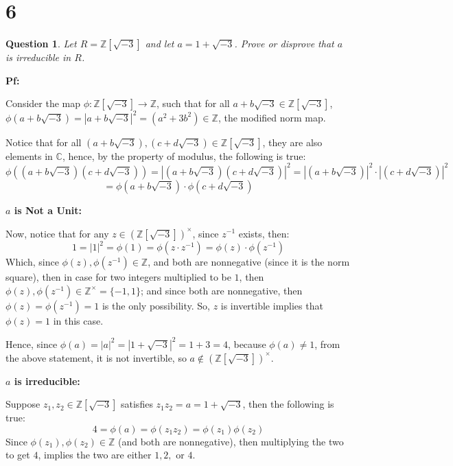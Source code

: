 \documentclass{article}
\newtheorem{question}{Question}
\begin{document}
\break

\section*{6}
\begin{myBox}[]{}
    \begin{question}
        Let $R=\mathbb{Z}[\sqrt{-3}]$ and let $a = 1 + \sqrt{-3}$. Prove or disprove that $a$ is irreducible in $R$.
    \end{question}
\end{myBox}

\textbf{Pf:}

Consider the map $\phi:\mathbb{Z}[\sqrt{-3}]\rightarrow \mathbb{Z}$, such that for all $a+b\sqrt{-3}\in \mathbb{Z}[\sqrt{-3}]$,
$\phi(a+b\sqrt{-3})=|a+b\sqrt{-3}|^2=(a^2+3b^2) \in \mathbb{Z}$, the modified norm map.

Notice that for all $(a+b\sqrt{-3}), (c+d\sqrt{-3})\in\mathbb{Z}[\sqrt{-3}]$, they are also elements in $\mathbb{C}$,
hence, by the property of modulus, the following is true:
$$\phi((a+b\sqrt{-3})(c+d\sqrt{-3})) = |(a+b\sqrt{-3})(c+d\sqrt{-3})|^2 = |(a+b\sqrt{-3})|^2\cdot|(c+d\sqrt{-3})|^2$$
$$=\phi(a+b\sqrt{-3})\cdot\phi(c+d\sqrt{-3})$$

\hfill

\textbf{$a$ is Not a Unit:}

Now, notice that for any $z\in(\mathbb{Z}[\sqrt{-3}])^\times$, since $z^{-1}$ exists, then:
$$1 = |1|^2 = \phi(1)=\phi(z\cdot z^{-1}) = \phi(z)\cdot\phi(z^{-1})$$
Which, since $\phi(z),\phi(z^{-1})\in\mathbb{Z}$, and both are nonnegative (since it is the norm square),
then in case for two integers multiplied to be $1$, then $\phi(z),\phi(z^{-1})\in \mathbb{Z}^\times = \{-1,1\}$;
and since both are nonnegative, then $\phi(z)=\phi(z^{-1})=1$ is the only possibility.
So, $z$ is invertible implies that $\phi(z)=1$ in this case.

Hence, since $\phi(a)=|a|^2=|1+\sqrt{-3}|^2 = 1+3 = 4$, because $\phi(a)\neq 1$, from the above statement, it is not invertible, so $a\notin (\mathbb{Z}[\sqrt{-3}])^\times$.

\hfill

\textbf{$a$ is irreducible:}

Suppose $z_1,z_2\in\mathbb{Z}[\sqrt{-3}]$ satisfies $z_1z_2= a = 1+\sqrt{-3}$, then the following is true:
$$4=\phi(a)=\phi(z_1z_2)=\phi(z_1)\phi(z_2)$$
Since $\phi(z_1),\phi(z_2)\in\mathbb{Z}$ (and both are nonnegative), then multiplying the two to get $4$, implies the two are either $1,2,$ or $4$.
\end{document}
